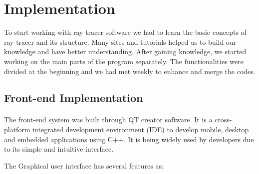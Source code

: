 \documentclass{article}
\begin{document}
\section{Implementation}

To start working with ray tracer software we had to learn the basic concepts of ray tracer and its structure. Many sites and tutorials helped us to build our knowledge and  have better understanding. After gaining knowledge, we started working on the main parts of the program separately. The functionalities were divided at the beginning and we had met weekly to enhance and merge the codes.  

\subsection{Front-end Implementation}
\paragraph{} The front-end system was built through QT creator software. It is a cross-platform integrated development environment (IDE) to develop mobile, desktop and embedded applications using C++. It is being widely used by developers due to its simple and intuitive interface.   

The Graphical user interface has several features as: 
\end{document}
